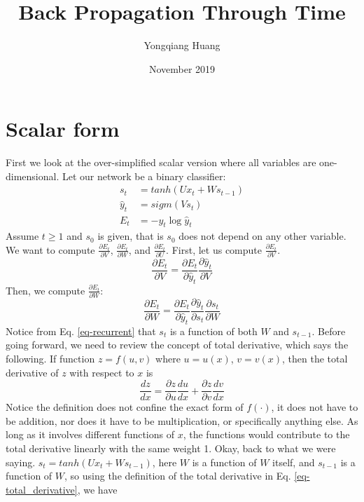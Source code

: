 \documentclass{article}
\title{Back Propagation Through Time}
\author{Yongqiang Huang}
\date{November 2019}
\begin{document}
\maketitle
\section{Scalar form}
First we look at the over-simplified scalar version where all variables are one-dimensional. Let our network be a binary classifier:
\begin{align}
    s_t &= tanh(Ux_t + Ws_{t-1}) \label{eq-recurrent} \\
    \hat{y}_t &= sigm(Vs_t) \\
    E_t &= -y_t\log \hat{y}_t
\end{align}
Assume $t \geq 1$ and $s_0$ is given, that is $s_0$ does not depend on any other variable. We want to compute $\frac{\partial E_t}{\partial V}$, $\frac{\partial E_t}{\partial W}$, and  $\frac{\partial E_t}{\partial U}$. First, let us compute $\frac{\partial E_t}{\partial V}$. 
\begin{equation}
    \frac{\partial E_t}{\partial V} = \frac{\partial E_t}{\partial \hat{y}_t}\frac{\partial \hat{y}_t}{\partial V}
\end{equation}
Then, we compute $\frac{\partial E_t}{\partial W}$:
\begin{equation}
    \frac{\partial E_t}{\partial W} = \frac{\partial E_t}{\partial \hat{y}_t}\frac{\partial \hat{y}_t}{\partial s_t}\frac{\partial s_t}{\partial W}
\end{equation}
Notice from Eq. \eqref{eq-recurrent} that $s_t$ is a function of both $W$ and $s_{t-1}$. Before going forward, we need to review the concept of total derivative, which says the following. If function $z = f(u, v)$ where $u = u(x)$, $v = v(x)$, then the total derivative of $z$ with respect to $x$ is
\begin{equation} \label{eq-total_derivative}
    \frac{dz}{dx} = \frac{\partial z}{\partial u}\frac{du}{dx} + \frac{\partial z}{\partial v}\frac{dv}{dx}
\end{equation}
Notice the definition does not confine the exact form of $f(\cdot)$, it does not have to be addition, nor does it have to be multiplication, or specifically anything else. As long as it involves different functions of $x$, the functions would contribute to the total derivative linearly with the same weight 1. Okay, back to what we were saying. $s_t = tanh(Ux_t + Ws_{t-1})$, here $W$ is a function of $W$ itself, and $s_{t-1}$ is a function of $W$, so using the definition of the total derivative in Eq. \eqref{eq-total_derivative}, we have 
\end{document}
